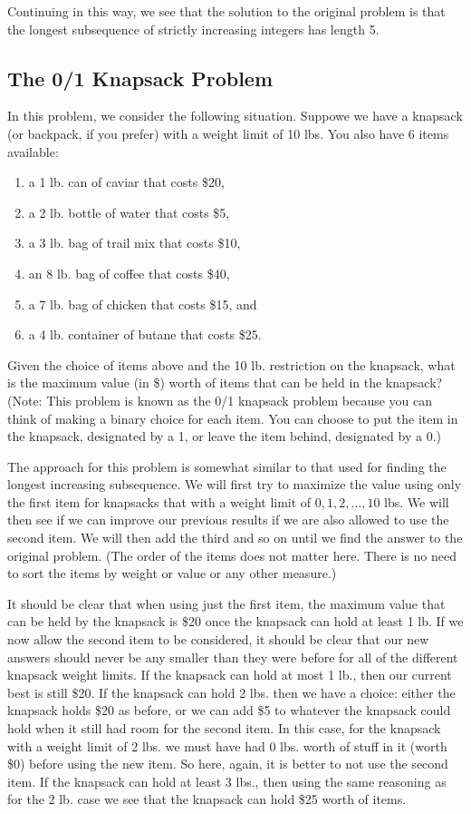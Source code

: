 \documentclass{ximera}
\begin{document}
Continuing in this way, we see that the solution to the original problem is that the longest subsequence of strictly increasing integers has length 5.

\subsection{The 0/1 Knapsack Problem}

In this problem, we consider the following situation. Suppowe we have a knapsack (or backpack, if you prefer) with a weight limit of 10 lbs. You also have 6 items available:
\begin{enumerate}
	\item a 1 lb. can of caviar that costs \$20,
	\item a 2 lb. bottle of water that costs \$5,
	\item a 3 lb. bag of trail mix that costs \$10,
	\item an 8 lb. bag of coffee that costs \$40,
	\item a 7 lb. bag of chicken that costs \$15, and
	\item a 4 lb. container of butane that costs \$25.
\end{enumerate}
Given the choice of items above and the 10 lb. restriction on the knapsack, what is the maximum value (in \$) worth of items that can be held in the knapsack? (Note: This problem is known as the 0/1 knapsack problem because you can think of making a binary choice for each item. You can choose to put the item in the knapsack, designated by a 1, or leave the item behind, designated by a 0.)

The approach for this problem is somewhat similar to that used for finding the longest increasing subsequence. We will first try to maximize the value using only the first item for knapsacks that with a weight limit of $0,1,2,\dots,10$ lbs. We will then see if we can improve our previous results if we are also allowed to use the second item. We will then add the third and so on until we find the answer to the original problem. (The order of the items does not matter here. There is no need to sort the items by weight or value or any other measure.)

It should be clear that when using just the first item, the maximum value that can be held by the knapsack is \$20 once the knapsack can hold at least 1 lb. If we now allow the second item to be considered, it should be clear that our new answers should never be any smaller than they were before for all of the different knapsack weight limits. If the knapsack can hold at most 1 lb., then our current best is still \$20. If the knapsack can hold 2 lbs. then we have a choice: either the knapsack holds \$20 as before, or we can add \$5 to whatever the knapsack could hold when it still had room for the second item. In this case, for the knapsack with a weight limit of 2 lbs. we must have had 0 lbs. worth of stuff in it (worth \$0) before using the new item. So here, again, it is better to not use the second item. If the knapsack can hold at least 3 lbs., then using the same reasoning as for the 2 lb. case we see that the knapsack can hold \$25 worth of items.
\end{document}
